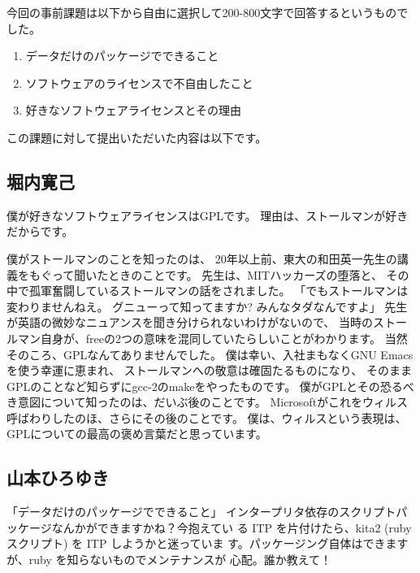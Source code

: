 \documentclass[mingoth,a4paper]{jsarticle}
\begin{document}

今回の事前課題は以下から自由に選択して200-800文字で回答するというものでした。

\begin{enumerate}
 \item データだけのパッケージでできること
 \item ソフトウェアのライセンスで不自由したこと
 \item 好きなソフトウェアライセンスとその理由
\end{enumerate}

この課題に対して提出いただいた内容は以下です。

\begin{multicols}{2}
{\footnotesize
\subsection{堀内寛己}

僕が好きなソフトウェアライセンスはGPLです。
理由は、ストールマンが好きだからです。

僕がストールマンのことを知ったのは、
20年以上前、東大の和田英一先生の講義をもぐって聞いたときのことです。
先生は、MITハッカーズの堕落と、
その中で孤軍奮闘しているストールマンの話をされました。
「でもストールマンは変わりませんねえ。
グニューって知ってますか? みんなタダなんですよ」
先生が英語の微妙なニュアンスを聞き分けられないわけがないので、
当時のストールマン自身が、freeの2つの意味を混同していたらしいことがわかります。
当然そのころ、GPLなんてありませんでした。
僕は幸い、入社まもなくGNU Emacsを使う幸運に恵まれ、
ストールマンへの敬意は確固たるものになり、
そのままGPLのことなど知らずにgcc-2のmakeをやったものです。
僕がGPLとその恐るべき意図について知ったのは、だいぶ後のことです。
Microsoftがこれをウィルス呼ばわりしたのほ、さらにその後のことです。
僕は、ウィルスという表現は、GPLについての最高の褒め言葉だと思っています。


\subsection{山本ひろゆき}

「データだけのパッケージでできること」
インタープリタ依存のスクリプトパッケージなんかができますかね？今抱えてい
る ITP を片付けたら、kita2 (ruby スクリプト) を ITP しようかと迷っていま
す。パッケージング自体はできますが、ruby を知らないものでメンテナンスが
心配。誰か教えて！

}
\end{multicols}
\end{document}
